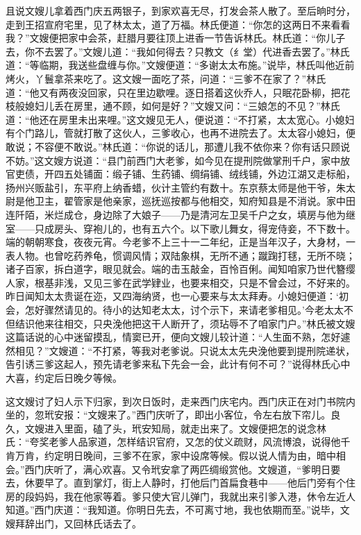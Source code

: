 且说文嫂儿拿着西门庆五两银子，到家欢喜无尽，打发会茶人散了。至后晌时分，走到王招宣府宅里，见了林太太，道了万福。林氏便道：“你怎的这两日不来看看我？”文嫂便把家中会茶，赶腊月要往顶上进香一节告诉林氏。林氏道：“你儿子去，你不去罢了。”文嫂儿道：“我如何得去？只教文（纟堂）代进香去罢了。”林氏道：“等临期，我送些盘缠与你。”文嫂便道：“多谢太太布施。”说毕，林氏叫他近前烤火，丫鬟拿茶来吃了。这文嫂一面吃了茶，问道：“三爹不在家了？”林氏道：“他又有两夜没回家，只在里边歇哩。逐日搭着这伙乔人，只眠花卧柳，把花枝般媳妇儿丢在房里，通不顾，如何是好？”文嫂又问：“三娘怎的不见？”林氏道：“他还在房里未出来哩。”这文嫂见无人，便说道：“不打紧，太太宽心。小媳妇有个门路儿，管就打散了这伙人，三爹收心，也再不进院去了。太太容小媳妇，便敢说；不容便不敢说。”林氏道：“你说的话儿，那遭儿我不依你来？你有话只顾说不妨。”这文嫂方说道：“县门前西门大老爹，如今见在提刑院做掌刑千户，家中放官吏债，开四五处铺面：缎子铺、生药铺、绸绢铺、绒线铺，外边江湖又走标船，扬州兴贩盐引，东平府上纳香蜡，伙计主管约有数十。东京蔡太师是他干爷，朱太尉是他卫主，翟管家是他亲家，巡抚巡按都与他相交，知府知县是不消说。家中田连阡陌，米烂成仓，身边除了大娘子——乃是清河左卫吴千户之女，填房与他为继室——只成房头、穿袍儿的，也有五六个。以下歌儿舞女，得宠侍妾，不下数十。端的朝朝寒食，夜夜元宵。今老爹不上三十一二年纪，正是当年汉子，大身材，一表人物。也曾吃药养龟，惯调风情；双陆象棋，无所不通；蹴踘打毬，无所不晓；诸子百家，拆白道字，眼见就会。端的击玉敲金，百怜百俐。闻知咱家乃世代簪缨人家，根基非浅，又见三爹在武学肄业，也要来相交，只是不曾会过，不好来的。昨日闻知太太贵诞在迩，又四海纳贤，也一心要来与太太拜寿。小媳妇便道：‘初会，怎好骤然请见的。待小的达知老太太，讨个示下，来请老爹相见。’今老太太不但结识他来往相交，只央浼他把这干人断开了，须玷辱不了咱家门户。”林氏被文嫂这篇话说的心中迷留摸乱，情窦已开，便向文嫂儿较计道：“人生面不熟，怎好遽然相见？”文嫂道：“不打紧，等我对老爹说。只说太太先央浼他要到提刑院递状，告引诱三爹这起人，预先请老爹来私下先会一会，此计有何不可？”说得林氏心中大喜，约定后日晚夕等候。

这文嫂讨了妇人示下归家，到次日饭时，走来西门庆宅内。西门庆正在对门书院内坐的，忽玳安报：“文嫂来了。”西门庆听了，即出小客位，令左右放下帘儿。良久，文嫂进入里面，磕了头，玳安知局，就走出来了。文嫂便把怎的说念林氏：“夸奖老爹人品家道，怎样结识官府，又怎的仗义疏财，风流博浪，说得他千肯万肯，约定明日晚间，三爹不在家，家中设席等候。假以说人情为由，暗中相会。”西门庆听了，满心欢喜。又令玳安拿了两匹绸缎赏他。文嫂道，“爹明日要去，休要早了。直到掌灯，街上人静时，打他后门首扁食巷中——他后门旁有个住房的段妈妈，我在他家等着。爹只使大官儿弹门，我就出来引爹入港，休令左近人知道。”西门庆道：“我知道。你明日先去，不可离寸地，我也依期而至。”说毕，文嫂拜辞出门，又回林氏话去了。

